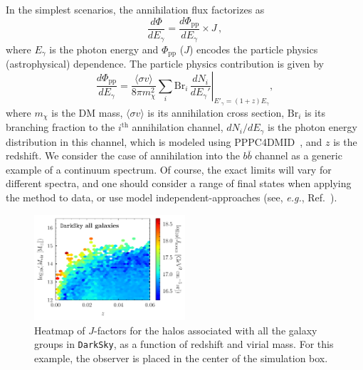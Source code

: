 In the simplest scenarios, the annihilation flux factorizes as 
\begin{equation}
\frac{d\Phi}{dE_{\gamma}} = \frac{d\Phi_\text{pp}}{dE_{\gamma}}\times J \, ,
\label{eq:flux}
\end{equation}
where $E_\gamma$ is the photon energy and $\Phi_\text{pp}$  ($J$) encodes the particle physics (astrophysical) dependence.
The particle physics contribution is given by
\begin{equation}
\frac{d\Phi_\text{pp}}{dE_{\gamma}}=\frac{\langle\sigma v\rangle}{8\pi m_{\chi}^{2}}\sum_i \text{Br}_{i}\, \left. \frac{dN_{i}}{dE_{\gamma}'} \right|_{E'_{\gamma} = (1+z) E_{\gamma}},
\end{equation}
where $m_\chi$ is the DM mass, $\langle \sigma v\rangle $ is its annihilation cross section, $\text{Br}_{i}$ is its branching fraction to the $i^\text{th}$ annihilation channel, $ dN_{i}/dE_{\gamma}$ is the photon energy distribution in this channel, which is modeled using  PPPC4DMID~\cite{Cirelli:2010xx}, and $z$ is the redshift.  We consider the case of annihilation into the $b \bar{b}$ channel as a generic example of a continuum spectrum. Of course, the exact limits will vary for different spectra, and one should  consider a range of final states when applying the method to data, or use model independent-approaches (see, {\it e.g.}, Ref.~\cite{Elor:2015tva,Elor:2015bho}).
\begin{figure}[t]
   \centering
     \includegraphics[width=0.5\textwidth]{ch-darksky/plots//DarkSky_heatmap.pdf}
   \caption{Heatmap of $J$-factors for the halos associated with all the galaxy groups in \texttt{DarkSky}, as a function of redshift and virial mass.  For this example, the observer is placed in the center of the simulation box. }
   \label{fig:heatmap}
\end{figure}


